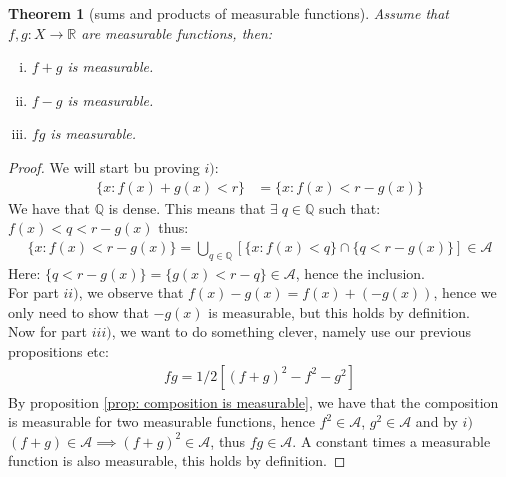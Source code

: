 \documentclass{article}
\newcommand{\R}{\mathbb{R}}
\newcommand{\A}{\mathcal{A}}
\newtheorem{proof}{Proof}
\newtheorem{theorem}{Theorem}
\begin{document}
\begin{theorem}[sums and products of measurable functions]
\label{thm: sums and product of measurable functions}
Assume that $f,g:X\to \R$ are measurable functions, then: 
\begin{enumerate}[i)]
    \item $f+g$ is measurable. 
    \item $f-g$ is measurable. 
    \item $fg$ is measurable.
\end{enumerate}
\end{theorem}


\begin{proof}
We will start bu proving $i)$: 
\begin{align*}
\{x: f(x) + g(x) < r\} &= \{x: f(x) < r -g(x)\}    
\end{align*}
We have that $\mathbb{Q}$ is dense. This means that $\exists\; q\in \mathbb{Q}$ such that:\\ 
$f(x) < q< r -g(x)$ thus: 
\begin{align*}
\{x: f(x) < r -g(x)\} = \bigcup_{q\in \mathbb{Q}} \left[\{x: f(x) < q\}\cap \{q < r-g(x)\}\right] \in \A    
\end{align*}
Here: $\{q < r-g(x)\} = \{g(x) < r-q\} \in \A$, hence the inclusion. \\ 
For part $ii)$, we observe that $f(x) -g(x) = f(x) + (-g(x))$, hence we only need to show that $-g(x)$ is measurable, but this holds by definition.\\ 
Now for part $iii)$, we want to do something clever, namely use our previous propositions etc: 
\begin{align*}
fg = 1/2[(f+g)^{2} - f^{2} - g^{2}]    
\end{align*}
By proposition \ref{prop: composition is measurable}, we have that the composition is measurable for two measurable functions, hence $f^{2}\in \A$, $g^{2}\in \A$ and by $i)$ $(f+g) \in \A \implies (f+g)^{2}\in \A$, thus $fg\in \A$. A constant times a measurable function is also measurable, this holds by definition. 
\end{proof}
\end{document}
